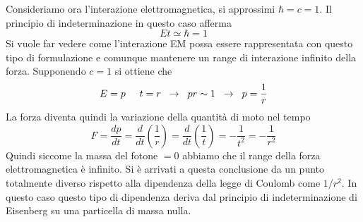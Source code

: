 Consideriamo ora l'interazione elettromagnetica, si approssimi $\hbar=c=1$.
Il principio di indeterminazione in questo caso afferma
\begin{equation}
Et\simeq \hbar=1
\end{equation}
Si vuole far vedere come l'interazione EM possa essere rappresentata con questo tipo di formulazione e comunque mantenere un range di interazione infinito della forza.
Supponendo $c=1$ si ottiene che 
\begin{equation}
E=p\hspace{0.5cm}t=r\hspace{0.2cm}\to\hspace{0.2cm}pr\sim 1\hspace{0.2cm}\to\hspace{0.2cm}p=\frac{1}{r}
\end{equation}
La forza diventa quindi la variazione della quantità di moto nel tempo
\begin{equation}
F=\frac{dp}{dt}=\frac{d}{dt}\left(\frac{1}{r}\right)=\frac{d}{dt}\left(\frac{1}{t}\right)=-\frac{1}{t^2}=-\frac{1}{r^2}
\end{equation}
Quindi siccome la massa del fotone $=0$ abbiamo che il range della forza elettromagnetica è infinito.
Si è arrivati a questa conclusione da un punto totalmente diverso rispetto alla dipendenza della legge di Coulomb come $1/r^2$.
In questo caso questo tipo di dipendenza deriva dal principio di indeterminazione di Eisenberg su una particella di massa nulla.

